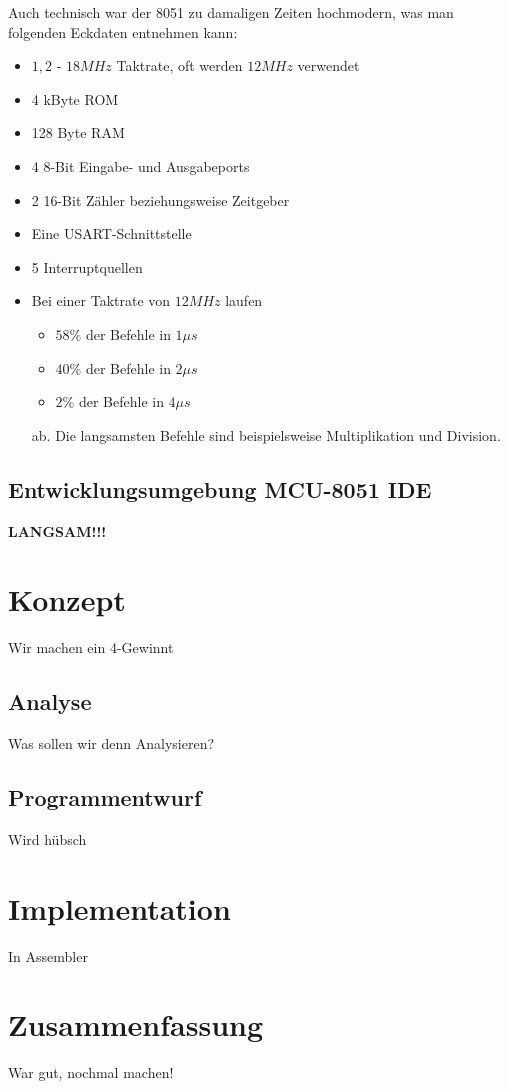 Auch technisch war der 8051 zu damaligen Zeiten hochmodern, was man folgenden Eckdaten entnehmen kann:
\begin{itemize}
  \item $1,2$ - $18 MHz$ Taktrate, oft werden $12 MHz$ verwendet
  \item 4 kByte ROM
  \item 128 Byte RAM
  \item 4 8-Bit Eingabe- und Ausgabeports
  \item 2 16-Bit Zähler beziehungsweise Zeitgeber
  \item Eine USART-Schnittstelle
  \item 5 Interruptquellen
  \item Bei einer Taktrate von $12 MHz$ laufen
    \begin{itemize}
      \item $58\%$ der Befehle in $1 \mu s$
      \item $40\%$ der Befehle in $2 \mu s$
      \item $2\%$ der Befehle in $4 \mu s$
    \end{itemize}
    ab. Die langsamsten Befehle sind beispielsweise Multiplikation und Division.
\end{itemize}


\section{Entwicklungsumgebung MCU-8051 IDE}

\textbf{LANGSAM!!!}

\chapter{Konzept}

Wir machen ein 4-Gewinnt

\section{Analyse}

Was sollen wir denn Analysieren?


\section{Programmentwurf}

Wird hübsch

\chapter{Implementation}

In Assembler

\chapter{Zusammenfassung}

War gut, nochmal machen!


